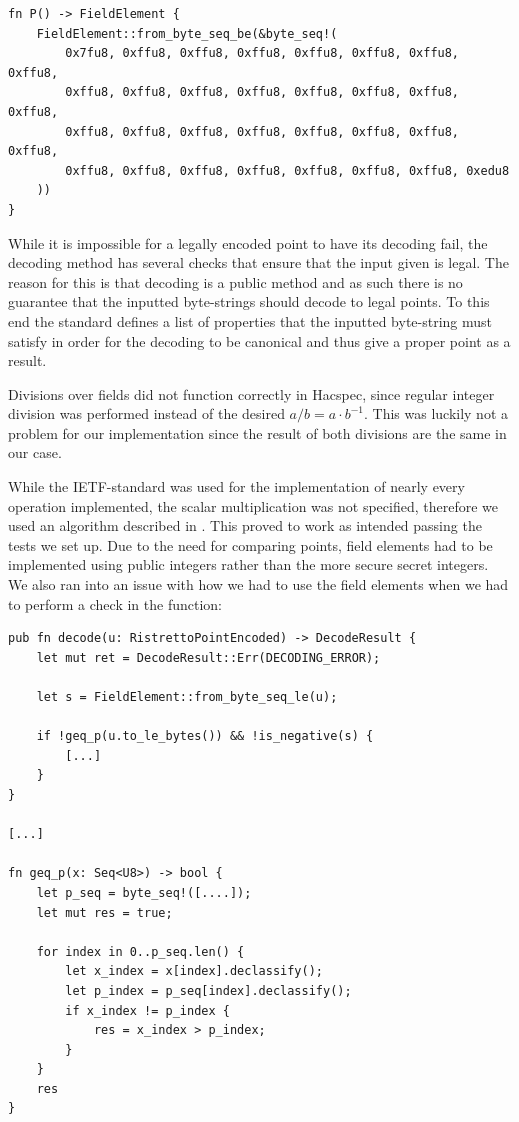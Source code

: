 \documentclass{article}
\newcommand*\ttvar[1]{\texttt{\expandafter\dottvar\detokenize{#1}\relax}}
\newcommand*\dottvar[1]{\ifx\relax#1\else
  \expandafter\ifx\string_#1\string_\allowbreak\else#1\fi
  \expandafter\dottvar\fi}
\begin{document}
\begin{lstlisting}
fn P() -> FieldElement {
	FieldElement::from_byte_seq_be(&byte_seq!(
		0x7fu8, 0xffu8, 0xffu8, 0xffu8, 0xffu8, 0xffu8, 0xffu8, 0xffu8,
		0xffu8, 0xffu8, 0xffu8, 0xffu8, 0xffu8, 0xffu8, 0xffu8, 0xffu8,
		0xffu8, 0xffu8, 0xffu8, 0xffu8, 0xffu8, 0xffu8, 0xffu8, 0xffu8,
		0xffu8, 0xffu8, 0xffu8, 0xffu8, 0xffu8, 0xffu8, 0xffu8, 0xedu8
	))
}
\end{lstlisting}

While it is impossible for a legally encoded point to have its decoding
fail, the decoding method has several checks that ensure that the input
given is legal. The reason for this is that decoding is a public method
and as such there is no guarantee that the inputted byte-strings should 
decode to legal points. To this end the standard defines a list of 
properties that the inputted byte-string must satisfy in order for the 
decoding to be canonical and thus give a proper point as a result.

Divisions over fields did not function correctly in Hacspec, since regular integer division was performed instead of the desired $a/b = a \cdot b^{-1}$. This was luckily not a problem for our implementation since the result of both divisions are the same in our case.

While the IETF-standard was used for the implementation of nearly every
operation implemented, the scalar multiplication was not specified,
therefore we used an algorithm described in \cite{elliptic-curves}. This
proved to work as intended passing the tests we set up. Due to the
need for comparing points, field elements had to be implemented using
public integers rather than the more secure secret integers. We also
ran into an issue with how we had to use the field elements when we
had to perform a check in the \ttvar{decode()} function:

\begin{lstlisting}
pub fn decode(u: RistrettoPointEncoded) -> DecodeResult {
	let mut ret = DecodeResult::Err(DECODING_ERROR);

	let s = FieldElement::from_byte_seq_le(u);

	if !geq_p(u.to_le_bytes()) && !is_negative(s) {
		[...]
	}
}

[...]

fn geq_p(x: Seq<U8>) -> bool {
	let p_seq = byte_seq!([....]);
	let mut res = true;

	for index in 0..p_seq.len() {
		let x_index = x[index].declassify();
		let p_index = p_seq[index].declassify();
		if x_index != p_index {
			res = x_index > p_index;
		}
	}
	res
}
\end{lstlisting}
\end{document}
